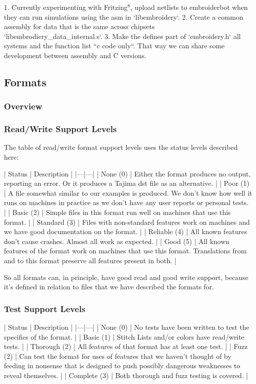 \documentclass[a4paper, 11pt]{report}
\begin{document}
1. Currently experimenting with Fritzing$^{8}$, upload netlists to embroiderbot
   when they can run simulations using the asm in `libembroidery`.
2. Create a common assembly for data that is the same across chipsets
   `libembrodiery\_data\_internal.s`.
3. Make the defines part of `embroidery.h` all systems and the function list
   ``c code only``. That way we can share some development between assembly and C
   versions.

\subsection{Formats}

\subsubsection{Overview}

\subsubsection{Read/Write Support Levels}

The table of read/write format support levels uses the status levels described here:

| Status | Description |
|---|---|
| None (0) | Either the format produces no output, reporting an error. Or it produces a Tajima dst file as an alternative. |
| Poor (1) | A file somewhat similar to our examples is produced. We don't know how well it runs on machines in practice as we don't have any user reports or personal tests. |
| Basic (2) | Simple files in this format run well on machines that use this format. |
| Standard (3) | Files with non-standard features work on machines and we have good documentation on the format. |
| Reliable (4) | All known features don't cause crashes. Almost all work as expected. |
| Good (5) | All known features of the format work on machines that use this format. Translations from and to this format preserve all features present in both. |

So all formats can, in principle, have good read and good write support, because it's defined in relation to files that we have described the formats for.

\subsubsection{Test Support Levels}

| Status | Description |
|---|---|
| None (0) | No tests have been written to test the specifics of the format. |
| Basic (1) | Stitch Lists and/or colors have read/write tests. |
| Thorough (2) | All features of that format has at least one test. |
| Fuzz (2) | Can test the format for uses of features that we haven't thought of by feeding in nonsense that is designed to push possibly dangerous weaknesses to reveal themselves. |
| Complete (3) | Both thorough and fuzz testing is covered. |
\end{document}
